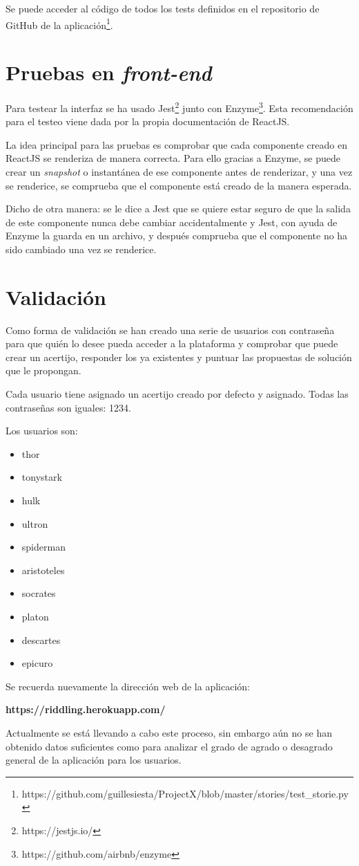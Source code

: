 Se puede acceder al código de todos los tests definidos en el repositorio de GitHub de la aplicación\footnote{https://github.com/guillesiesta/ProjectX/blob/master/stories/test\_storie.py}. 

\section{Pruebas en \textit{front-end}}

Para testear la interfaz se ha usado Jest\footnote{https://jestjs.io/} junto con Enzyme\footnote{https://github.com/airbnb/enzyme}. Esta recomendación para el testeo viene dada por la propia documentación de ReactJS\cite{testreact}.

La idea principal para las pruebas es comprobar que cada componente creado en ReactJS se renderiza de manera correcta. Para ello gracias a Enzyme, se puede crear un \textit{snapshot} o instantánea de ese componente antes de renderizar, y una vez se renderice, se comprueba que el componente está creado de la manera esperada\cite{testreact2}.

Dicho de otra manera: se le dice a Jest que se quiere estar seguro de que la salida de este componente nunca debe cambiar accidentalmente y Jest, con ayuda de Enzyme la guarda en un archivo, y después comprueba que el componente no ha sido cambiado una vez se renderice.

\section{Validación}

Como forma de validación se han creado una serie de usuarios con contraseña para que quién lo desee pueda acceder a la plataforma y comprobar que puede crear un acertijo, responder los ya existentes y puntuar las propuestas de solución que le propongan.

Cada usuario tiene asignado un acertijo creado por defecto y asignado. Todas las contraseñas son iguales: 1234.

Los usuarios son:
\begin{itemize}
    \item thor
    \item tonystark
    \item hulk
    \item ultron
    \item spiderman
    \item aristoteles
    \item socrates
    \item platon
    \item descartes
    \item epicuro
\end{itemize}

Se recuerda nuevamente la dirección web de la aplicación:

\textbf{https://riddling.herokuapp.com/}

Actualmente se está llevando a cabo este proceso, sin embargo aún no se han obtenido datos suficientes como para analizar el grado de agrado o desagrado general de la aplicación para los usuarios. 